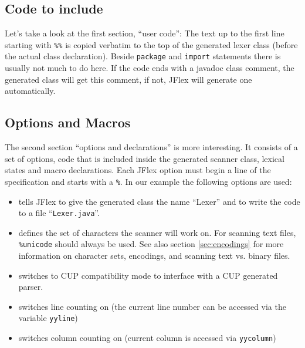 \documentclass[11pt]{scrartcl}
\begin{document}
\subsection{Code to include\label{ExampleUserCode}}
Let's take a look at the first section, ``user code'': The text up to the
first line starting with \texttt{\%\%} is copied verbatim to the top 
of the generated lexer class (before the actual class declaration). 
Beside \texttt{package} and \texttt{import} statements there is usually not much 
to do here. If the code ends with a javadoc class comment, the generated class
will get this comment, if not, JFlex will generate one automatically.

\subsection{Options and Macros\label{ExampleOptions}}
The second section ``options and declarations'' is more interesting. It consists
of a set of options, code that is included inside the generated scanner
class, lexical states and macro declarations. Each JFlex option must begin
a line of the specification and starts with a \texttt{\%}. In our example
the following options are used:

\begin{itemize}
\item
  \texttt{} tells JFlex to give the
  generated class the name ``Lexer'' and to write the code to a file ``\texttt{Lexer.java}''.

\item
  \texttt{} defines the set of characters the scanner will 
  work on. For scanning text files, \texttt{\%unicode} should always be used. See also
  section \ref{sec:encodings} for more information on character sets, encodings, and
  scanning text vs. binary files.

\item
  \texttt{} switches to CUP compatibility
  mode to interface with a CUP generated parser.

\item
  \texttt{} switches line counting on (the
  current line number can be accessed via the variable \texttt{yyline})

\item
  \texttt{} switches column counting on
  (current column is accessed via \texttt{yycolumn})

\end{itemize}
\label{ExampleScannerCode}
\end{document}
